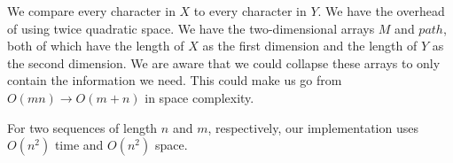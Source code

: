 \documentclass{tufte-handout}
\begin{document}
We compare every character in $X$ to every character in $Y$.
We have the overhead of using twice quadratic space. We have the two-dimensional arrays $M$ and $path$, both of which have the length of $X$ as the first dimension and the length of $Y$ as the second dimension.
We are aware that we could collapse these arrays to only contain the information we need.
This could make us go from $O(m n) \rightarrow O(m+n)$ in space complexity.

For two sequences of length $n$ and $m$, respectively, our implementation uses $O(n^2)$ time and $O(n^2)$ space.
\end{document}

